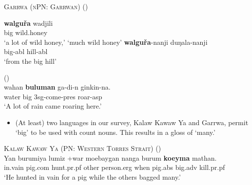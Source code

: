 \documentclass{article}
\begin{document}
\begin{exe}
  \ex \textsc{Garrwa (nPN: Garrwan)} (\citealt{furby77})
  \begin{xlist}
    \ex \gll \textbf{walgu\v{r}a} wadjili \\
    big wild.honey\\
    \glt `a lot of wild honey,' `much wild honey' %
    \ex \gll \textbf{walgu\v{r}a}-nanji duŋala-nanji\\
    big-{\sc abl} hill-{\sc abl}\\
    \glt `from the big hill' %
  \end{xlist}
   (\citealt[67]{wilson06})\\
  \gll wahan \textbf{buluman} ga-di-n   ginkin-na.\\
  water   big  3{\sc sg}-come-{\sc pres} roar-{\sc asp}\\
  \glt `A lot of rain came roaring here.'
\end{exe}

\begin{itemize}
\item (At least) two languages in our survey, Kalaw Kawaw Ya and Garrwa, permit `big'  to be used with count nouns. This results in a gloss of `many.' %
\end{itemize}

\begin{exe}
  \ex \textsc{Kalaw Kawaw Ya (PN: Western Torres Strait)} (\citealt[141]{fo91})\\
  \gll Yan burumiya lumiz +war moebaygan nanga burum        \textbf{koeyma}    mathan.\\
  in.vain pig.{\sc com} hunt.{\sc pr.pf} other person.{\sc erg} when   pig.{\sc abs}    big.{\sc adv}    kill.{\sc pr.pf}\\
  \glt `He hunted in vain for a pig while the others bagged many.'

\end{exe}
\end{document}
